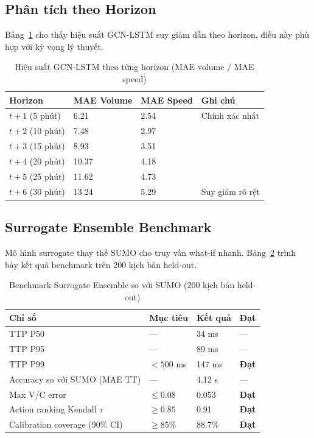 \subsection{Phân tích theo Horizon}

Bảng~\ref{tab:forecast_horizon} cho thấy hiệu suất GCN-LSTM suy giảm dần theo horizon, điều này phù hợp với kỳ vọng lý thuyết.

\begin{table}[H]
\centering
\caption{Hiệu suất GCN-LSTM theo từng horizon (MAE volume / MAE speed)}
\label{tab:forecast_horizon}
\renewcommand{\arraystretch}{1.4}
\begin{tabular}{p{3cm} p{2.5cm} p{2.5cm} p{4cm}}
\toprule
\textbf{Horizon} & \textbf{MAE Volume} & \textbf{MAE Speed} & \textbf{Ghi chú} \\
\midrule
$t+1$ (5 phút) & 6.21 & 2.54 & Chính xác nhất \\
\rowcolor{rowgray}
$t+2$ (10 phút) & 7.48 & 2.97 & \\
$t+3$ (15 phút) & 8.93 & 3.51 & \\
\rowcolor{rowgray}
$t+4$ (20 phút) & 10.37 & 4.18 & \\
$t+5$ (25 phút) & 11.62 & 4.73 & \\
\rowcolor{rowgray}
$t+6$ (30 phút) & 13.24 & 5.29 & Suy giảm rõ rệt \\
\bottomrule
\end{tabular}
\end{table}

\subsection{Surrogate Ensemble Benchmark}

Mô hình surrogate thay thế SUMO cho truy vấn what-if nhanh. Bảng~\ref{tab:surrogate_bench} trình bày kết quả benchmark trên 200 kịch bản held-out.

\begin{table}[H]
\centering
\caption{Benchmark Surrogate Ensemble so với SUMO (200 kịch bản held-out)}
\label{tab:surrogate_bench}
\renewcommand{\arraystretch}{1.4}
\begin{tabular}{p{5cm} p{2.5cm} p{2.5cm} p{2cm}}
\toprule
\textbf{Chỉ số} & \textbf{Mục tiêu} & \textbf{Kết quả} & \textbf{Đạt} \\
\midrule
TTP P50 & --- & 34 ms & --- \\
\rowcolor{rowgray}
TTP P95 & --- & 89 ms & --- \\
TTP P99 & $< 500$ ms & 147 ms & \textcolor{green!50!black}{\textbf{Đạt}} \\
\rowcolor{rowgray}
Accuracy so với SUMO (MAE TT) & --- & 4.12 s & --- \\
Max V/C error & $\leq 0.08$ & 0.053 & \textcolor{green!50!black}{\textbf{Đạt}} \\
\rowcolor{rowgray}
Action ranking Kendall $\tau$ & $\geq 0.85$ & 0.91 & \textcolor{green!50!black}{\textbf{Đạt}} \\
Calibration coverage (90\% CI) & $\geq 85\%$ & 88.7\% & \textcolor{green!50!black}{\textbf{Đạt}} \\
\bottomrule
\end{tabular}
\end{table}

